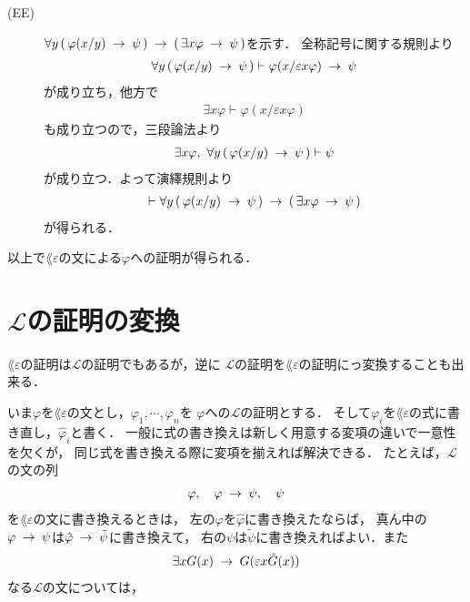 \begin{description}
\begin{description}
				\item[(EE)]
					$\forall y\, (\, \varphi(x/y) \hspace{0.25em}\rightarrow\hspace{0.25em} \psi\, ) 
					\hspace{0.25em}\rightarrow\hspace{0.25em} (\, \exists x \varphi \hspace{0.25em}\rightarrow\hspace{0.25em} \psi\, )$を示す．
					全称記号に関する規則より
					\begin{align}
						\forall y\, (\, \varphi(x/y) \hspace{0.25em}\rightarrow\hspace{0.25em} \psi\, ) \vdash
						\varphi(x/\varepsilon x \varphi) \hspace{0.25em}\rightarrow\hspace{0.25em} \psi
					\end{align}
					が成り立ち，他方で
					\begin{align}
						\exists x \varphi \vdash \varphi(x/\varepsilon x \varphi)
					\end{align}
					も成り立つので，三段論法より
					\begin{align}
						\exists x \varphi,\ \forall y\, (\, \varphi(x/y) \hspace{0.25em}\rightarrow\hspace{0.25em} \psi\, ) \vdash \psi
					\end{align}
					が成り立つ．よって演繹規則より
					\begin{align}
						\vdash \forall y\, (\, \varphi(x/y) \hspace{0.25em}\rightarrow\hspace{0.25em} \psi\, ) 
						\hspace{0.25em}\rightarrow\hspace{0.25em} (\, \exists x \varphi \hspace{0.25em}\rightarrow\hspace{0.25em} \psi\, )
					\end{align}
					が得られる．
					\QED
			\end{description}
	\end{description}
	以上で$\lang{\varepsilon}$の文による$\varphi$への証明が得られる．
	
\section{$\mathcal{L}$の証明の変換}
	$\lang{\varepsilon}$の証明は$\mathcal{L}$の証明でもあるが，逆に
	$\mathcal{L}$の証明を$\lang{\varepsilon}$の証明にっ変換することも出来る．
	
	いま$\varphi$を$\lang{\varepsilon}$の文とし，$\varphi_{1},\cdots,\varphi_{n}$を
	$\varphi$への$\mathcal{L}$の証明とする．
	そして$\varphi_{i}$を$\lang{\varepsilon}$の式に書き直し，$\hat{\varphi}_{i}$と書く．
	一般に式の書き換えは新しく用意する変項の違いで一意性を欠くが，
	同じ式を書き換える際に変項を揃えれば解決できる．
	たとえば，$\mathcal{L}$の文の列
	\begin{align}
		\varphi,\quad \varphi \hspace{0.25em}\rightarrow\hspace{0.25em} \psi,\quad \psi
	\end{align}
	を$\lang{\varepsilon}$の文に書き換えるときは，
	左の$\varphi$を$\hat{\varphi}$に書き換えたならば，
	真ん中の$\varphi \hspace{0.25em}\rightarrow\hspace{0.25em} \psi$は$\hat{\varphi} \hspace{0.25em}\rightarrow\hspace{0.25em} \tilde{\psi}$に書き換えて，
	右の$\psi$は$\tilde{\psi}$に書き換えればよい．また
	\begin{align}
		\exists x G(x) \hspace{0.25em}\rightarrow\hspace{0.25em} G(\varepsilon x \hat{G}(x))
	\end{align}
	なる$\mathcal{L}$の文については，